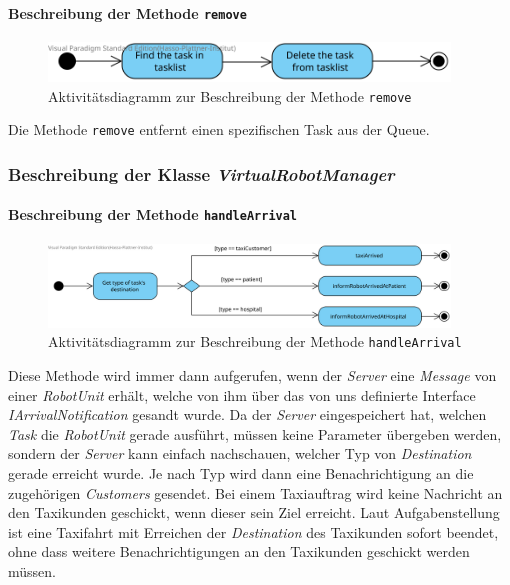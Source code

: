 			\paragraph{Beschreibung der Methode \texttt{remove}}		
			\begin{figure}[H]
			\centering
			\includegraphics[width=0.95\textwidth]{img/2-Entwurf-remove}
			\caption{Aktivitätsdiagramm zur Beschreibung der Methode \texttt{remove}}
			\label{SequenzQueueRemove}
			\end{figure}			
			
			Die Methode \texttt{remove} entfernt einen spezifischen Task aus der Queue.
			
	\subsubsection{Beschreibung der Klasse \textit{VirtualRobotManager}}
			\paragraph{Beschreibung der Methode \texttt{handleArrival}}
			\begin{figure}[H]
			\centering
			\includegraphics[width=0.95\textwidth]{img/HandleArrival}
			\caption{Aktivitätsdiagramm zur Beschreibung der Methode \texttt{handleArrival}}
			\label{SequenzQueuePoll}
			\end{figure}	
			Diese Methode wird immer dann aufgerufen, wenn der \textit{Server} eine \textit{Message} von einer \textit{RobotUnit} erhält, welche von ihm über das von uns definierte Interface \textit{IArrivalNotification} gesandt wurde. Da der \textit{Server} eingespeichert hat, welchen \textit{Task} die \textit{RobotUnit} gerade ausführt, müssen keine Parameter übergeben werden, sondern der \textit{Server} kann einfach nachschauen, welcher Typ von \textit{Destination} gerade erreicht wurde. Je nach Typ wird dann eine Benachrichtigung an die zugehörigen \textit{Customers} gesendet. Bei einem Taxiauftrag wird keine Nachricht an den Taxikunden geschickt, wenn dieser sein Ziel erreicht. Laut Aufgabenstellung ist eine Taxifahrt mit Erreichen der \textit{Destination} des Taxikunden sofort beendet, ohne dass weitere Benachrichtigungen an den Taxikunden geschickt werden müssen.
			

